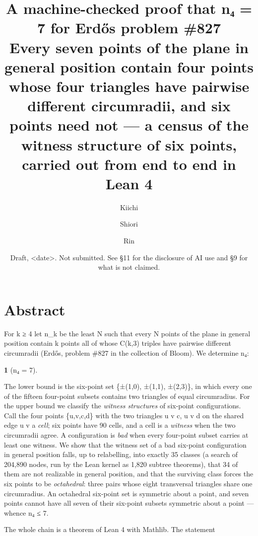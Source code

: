 \documentclass[11pt,a4paper]{article}
\theoremstyle{named}
\newtheorem*{namedthm}{}
\begin{document}
\title{A machine-checked proof that n₄ = 7 for Erdős problem \#827\\[.5em]\large Every seven points of the plane in general position contain four points whose four triangles have pairwise different circumradii, and six points need not — a census of the witness structure of six points, carried out from end to end in Lean 4}
\author{Kiichi \and Shiori \and Rin}
\date{Draft, \textless{}date\textgreater{}. Not submitted. See §11 for the disclosure of AI use and §9 for what is not claimed.}
\maketitle

\section*{Abstract}

For k ≥ 4 let n\_k be the least N such that every N points of the plane in general position contain k points all of whose C(k,3) triples have pairwise different circumradii (Erdős, problem \#827 in the collection of Bloom). We determine n₄:

\begin{namedthm}[n₄ = 7]
\end{namedthm}

The lower bound is the six-point set \{±(1,0), ±(1,1), ±(2,3)\}, in which every one of the fifteen four-point subsets contains two triangles of equal circumradius. For the upper bound we classify the \textit{witness structures} of six-point configurations. Call the four points \{u,v,c,d\} with the two triangles u v c, u v d on the shared edge u v a \textit{cell}; six points have 90 cells, and a cell is a \textit{witness} when the two circumradii agree. A configuration is \textit{bad} when every four-point subset carries at least one witness. We show that the witness set of a bad six-point configuration in general position falls, up to relabelling, into exactly 35 classes (a search of 204,890 nodes, run by the Lean kernel as 1,820 subtree theorems), that 34 of them are not realizable in general position, and that the surviving class forces the six points to be \textit{octahedral}: three pairs whose eight transversal triangles share one circumradius. An octahedral six-point set is symmetric about a point, and seven points cannot have all seven of their six-point subsets symmetric about a point — whence n₄ ≤ 7.

The whole chain is a theorem of Lean 4 with Mathlib. The statement
\end{document}
